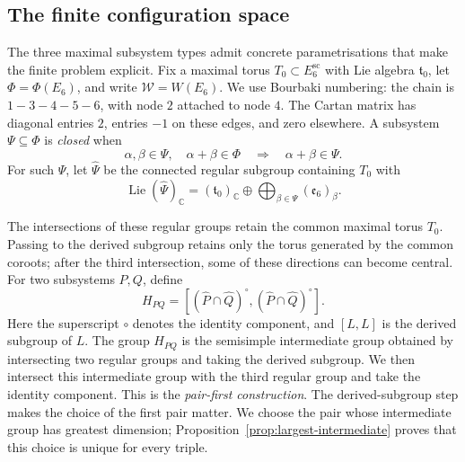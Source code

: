 \documentclass[11pt]{article}
\theoremstyle{remark}
\newcommand{\e}{\mathfrak e}
\begin{document}
\subsection{The finite configuration space}

The three maximal subsystem types admit concrete parametrisations that make
the finite problem explicit. Fix a maximal torus \(T_0\subset E_6^{\mathrm{sc}}\)
with Lie algebra \(\mathfrak t_0\), let \(\Phi=\Phi(E_6)\), and write
\(\mathcal W=W(E_6)\). We use Bourbaki numbering: the chain is
\(1-3-4-5-6\), with node \(2\) attached to node \(4\). The Cartan matrix
has diagonal entries \(2\), entries \(-1\) on these edges, and zero
elsewhere. A subsystem
\(\Psi\subseteq\Phi\) is \emph{closed} when
\[
 \alpha,\beta\in\Psi,\quad \alpha+\beta\in\Phi
 \quad\Longrightarrow\quad \alpha+\beta\in\Psi.
\]
For such \(\Psi\), let \(\widehat\Psi\) be the connected regular
subgroup containing \(T_0\) with
\[
 \operatorname{Lie}(\widehat\Psi)_{\mathbb C}
 =(\mathfrak t_0)_{\mathbb C}
  \oplus\bigoplus_{\beta\in\Psi}(\e_6)_{\beta}.
\]

The intersections of these regular groups retain the common maximal torus
\(T_0\). Passing to the derived subgroup retains only the torus generated
by the common coroots; after the third intersection, some of these
directions can become central.
For two subsystems \(P,Q\), define
\[
 H_{PQ}=[(\widehat P\cap\widehat Q)^\circ,
          (\widehat P\cap\widehat Q)^\circ].
\]
Here the superscript \(\circ\) denotes the identity component, and
\([L,L]\) is the derived subgroup of \(L\).
The group \(H_{PQ}\) is the semisimple intermediate group obtained by
intersecting two regular groups and taking the derived subgroup. We then
intersect this intermediate group with the third regular group and take the identity
component. This is the \emph{pair-first construction}. The derived-subgroup
step makes the choice of the first pair matter. We choose the pair whose
intermediate group has greatest dimension; Proposition~\ref{prop:largest-intermediate}
proves that this choice is unique for every triple.
\end{document}
